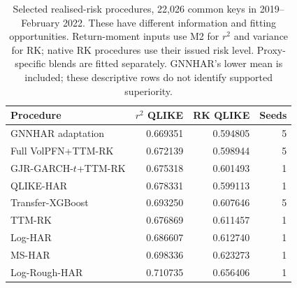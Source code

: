 \begin{table}[!htbp]\centering
\begingroup\small\setlength{\tabcolsep}{4pt}
\caption[Selected realised-risk scores]{Selected realised-risk procedures, 22,026 common keys in 2019--February 2022. These have different information and fitting opportunities. Return-moment inputs use M2 for $r^2$ and variance for RK; native RK procedures use their issued risk level. Proxy-specific blends are fitted separately. GNNHAR's lower mean is included; these descriptive rows do not identify supported superiority.}\label{tab:new-intraday}
\begin{tabular}{@{}>{\raggedright\arraybackslash}p{6.5cm}rrr@{}}
\toprule
Procedure & $r^2$ QLIKE & RK QLIKE & Seeds \\
\midrule
GNNHAR adaptation & 0.669351 & 0.594805 & 5 \\
Full VolPFN+TTM-RK & 0.672139 & 0.598944 & 5 \\
GJR-GARCH-$t$+TTM-RK & 0.675318 & 0.601493 & 1 \\
QLIKE-HAR & 0.678331 & 0.599113 & 1 \\
Transfer-XGBoost & 0.693250 & 0.607646 & 5 \\
TTM-RK & 0.676869 & 0.611457 & 1 \\
Log-HAR & 0.686607 & 0.612740 & 1 \\
MS-HAR & 0.698336 & 0.623273 & 1 \\
Log-Rough-HAR & 0.710735 & 0.656406 & 1 \\
\bottomrule
\end{tabular}\endgroup\end{table}

